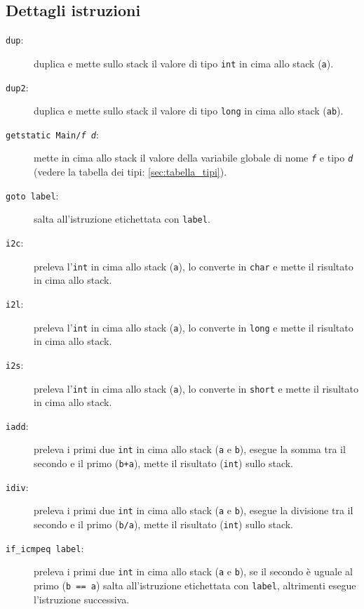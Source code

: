 \subsection{Dettagli istruzioni}
\label{sec:dettagli_istruzioni}
\begin{description}
  \item[\texttt{dup}:] duplica e mette sullo stack il valore di tipo \texttt{int} in cima allo stack (\texttt{a}).

  \item[\texttt{dup2}:] duplica e mette sullo stack il valore di tipo \texttt{long} in cima allo stack (\texttt{ab}).

  \item[\texttt{getstatic Main/\textit{f} \textit{d}}:] mette in cima allo stack il valore della variabile globale di nome \texttt{\textit{f}} e tipo \texttt{\textit{d}} (vedere la tabella dei tipi: \ref{sec:tabella_tipi}).

  \item[\texttt{goto label}:] salta all'istruzione etichettata con \texttt{label}.

  \item[\texttt{i2c}:] preleva l'\texttt{int} in cima allo stack (\texttt{a}), lo converte in \texttt{char} e mette il risultato in cima allo stack.

  \item[\texttt{i2l}:] preleva l'\texttt{int} in cima allo stack (\texttt{a}), lo converte in \texttt{long} e mette il risultato in cima allo stack.

  \item[\texttt{i2s}:] preleva l'\texttt{int} in cima allo stack (\texttt{a}), lo converte in \texttt{short} e mette il risultato in cima allo stack.

  \item[\texttt{iadd}:] preleva i primi due \texttt{int} in cima allo stack (\texttt{a} e \texttt{b}), esegue la somma tra il secondo e il primo (\texttt{b+a}), mette il risultato (\texttt{int}) sullo stack.

  \item[\texttt{idiv}:] preleva i primi due \texttt{int} in cima allo stack (\texttt{a} e \texttt{b}), esegue la divisione tra il secondo e il primo (\texttt{b/a}), mette il risultato (\texttt{int}) sullo stack.

  \item[\texttt{if\_icmpeq label}:] preleva i primi due \texttt{int} in cima allo stack (\texttt{a} e \texttt{b}), se il secondo \`e uguale al primo (\texttt{b == a}) salta all'istruzione etichettata con \texttt{label}, altrimenti esegue l'istruzione successiva.


\end{description}
